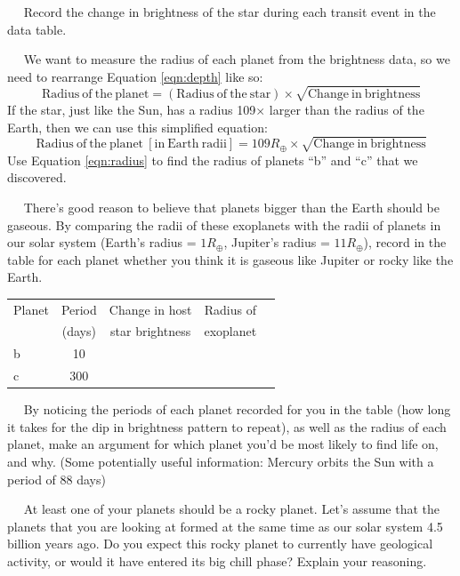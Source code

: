 \documentclass[12pt]{article}
\newcommand{\question}[1]{\vspace{10mm} \noindent {\bf #1)}~~}
\begin{document}
\question{1} Record the change in brightness of the star during each transit event in the data table. 

\question{2} We want to measure the radius of each planet from the brightness data, so we need to rearrange Equation \ref{eqn:depth} like so:
\begin{equation}
\mathrm{Radius~of~the~planet} = \left( \mathrm{Radius~of~the~star} \right) \times \sqrt{\mathrm{Change~in~brightness}}
\end{equation}
If the star, just like the Sun, has a radius 109$\times$ larger than the radius of the Earth, then we can use this simplified equation:
\begin{equation}
\mathrm{Radius~of~the~planet~[in~Earth~radii]} = 109R_\oplus  \times \sqrt{\mathrm{Change~in~brightness}} \label{eqn:radius}
\end{equation}
Use Equation \ref{eqn:radius} to find the radius of planets ``b'' and ``c'' that we discovered. 

\question{3} There's good reason to believe that planets bigger than the Earth should be gaseous. By comparing the radii of these exoplanets with the radii of planets in our solar system (Earth's radius = $1 R_\oplus$, Jupiter's radius = $11 R_\oplus$), record in the table for each planet whether you think it is gaseous like Jupiter or rocky like the Earth.

\vspace{1cm}
\begin{table}[h!]
\centering
\begin{tabular}{|l |c |c| c| c|}
\hline
Planet & Period & Change in host & Radius of    \\
 & (days) & star brightness  &  exoplanet     \\ \hline
b & 10 & & \\ \hline
c & 300 & & \\ \hline
\end{tabular}
\end{table}

\question{4} By noticing the periods of each planet recorded for you in the table (how long it takes for the dip in brightness pattern to repeat), as well as the radius of each planet, make an argument for which planet you'd be most likely to find life on, and why. (Some potentially useful information: Mercury orbits the Sun with a period of 88 days)
\vspace{6 cm}

\question{5} At least one of your planets should be a rocky planet. Let's assume that the planets that you are looking at formed at the same time as our solar system 4.5 billion years ago. Do you expect this rocky planet to currently have geological activity, or would it have entered its big chill phase? Explain your reasoning.
\vspace{6 cm}
\end{document}
